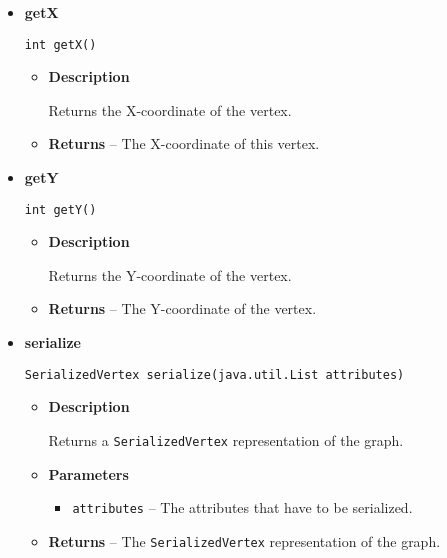 {{{{{{{{{{{{{\begin{itemize}
{\begin{itemize}
{Returns the name of the vertex. A descriptive name of the vertex. Multiple vertices with equal name in one graph are allowed. Therefore don't use this as identifier, instead use \texttt{\small getID()}.
}
\item{{\bf  Returns} -- 
The name of the vertex. 
}%
\end{itemize}
}%
\item{ 
{\bf  getX}\\
\begin{lstlisting}[frame=none]
int getX()\end{lstlisting} %
\begin{itemize}
\item{
{\bf  Description}

Returns the X-coordinate of the vertex.
}
\item{{\bf  Returns} -- 
The X-coordinate of this vertex. 
}%
\end{itemize}
}%
\item{ 
{\bf  getY}\\
\begin{lstlisting}[frame=none]
int getY()\end{lstlisting} %
\begin{itemize}
\item{
{\bf  Description}

Returns the Y-coordinate of the vertex.
}
\item{{\bf  Returns} -- 
The Y-coordinate of the vertex. 
}%
\end{itemize}
}%
\item{ 
{\bf  serialize}\\
\begin{lstlisting}[frame=none]
SerializedVertex serialize(java.util.List attributes)\end{lstlisting} %
\begin{itemize}
\item{
{\bf  Description}

Returns a \texttt{\small SerializedVertex}{\small 
{}} representation of the graph.
}
\item{
{\bf  Parameters}
  \begin{itemize}
   \item{
\texttt{attributes} -- The attributes that have to be serialized.}
  \end{itemize}
}%
\item{{\bf  Returns} -- 
The \texttt{\small SerializedVertex}{\small 
{}} representation of the graph. 
}%
\end{itemize}
}%
\end{itemize}
}
}
}}}}}}}}}}}
